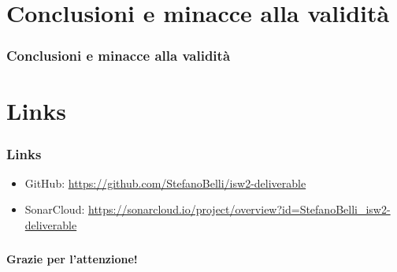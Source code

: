 \documentclass{beamer}
\begin{document}
\section{Conclusioni e minacce alla validità}
\begin{frame}
	\frametitle{Conclusioni e minacce alla validità}
	
\end{frame}

\section{Links}
\begin{frame}
	\frametitle{Links}
	
	\begin{itemize}
		\item GitHub: \url{https://github.com/StefanoBelli/isw2-deliverable}
		\item SonarCloud: \url{https://sonarcloud.io/project/overview?id=StefanoBelli_isw2-deliverable}
	\end{itemize}
	
\end{frame}

\begin{frame}
    \frametitle{}
    
    \fontsize{30pt}{10pt}\selectfont
    \centering
    \textbf{Grazie per l'attenzione!}
    
\end{frame}
\end{document}
